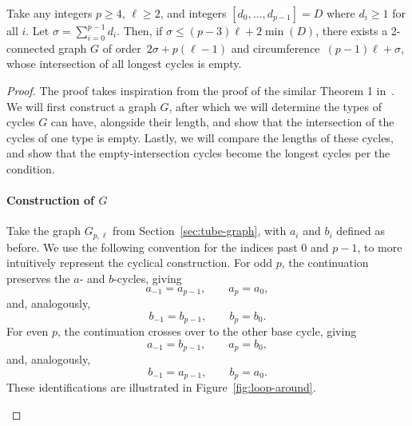 \begin{theorem}
  \label{theorem:d-extension}
Take any integers $p \ge 4$, $\ell \ge 2$, and integers $[d_0,\ldots,d_{p-1}] = D$ where $d_i \ge 1$ for all $i$. Let $\sigma = \sum_{i=0}^{p-1}d_i$. Then, if $\sigma \le (p-3)\ell + 2\min(D)$, there exists a 2-connected graph $G$ of order~$2\sigma + p(\ell-1)$ and circumference~$(p-1)\ell+\sigma$, whose intersection of all longest cycles is empty.
\end{theorem}
\begin{proof}
The proof takes inspiration from the proof of the similar Theorem 1 in~\cite{article:zamfirescu}. We will first construct a graph $G$, after which we will determine the types of cycles $G$ can have, alongside their length, and show that the intersection of the cycles of one type is empty. Lastly, we will compare the lengths of these cycles, and show that the empty-intersection cycles become the longest cycles per the condition.

\paragraph{Construction of $G$}
Take the graph $G_{p,\ell}$ from Section~\ref{sec:tube-graph}, with $a_i$ and $b_i$ defined as before. We use the following convention for the indices past 0 and $p-1$, to more intuitively represent the cyclical construction. For odd $p$, the continuation preserves the $a$- and $b$-cycles, giving
\[
a_{-1}=a_{p-1}, \qquad a_p=a_0,
\]
and, analogously,
\[
b_{-1}=b_{p-1}, \qquad b_p=b_0.
\]
For even $p$, the continuation crosses over to the other base cycle, giving
\[
a_{-1}=b_{p-1}, \qquad a_p=b_0,
\]
and, analogously,
\[
b_{-1}=a_{p-1}, \qquad b_p=a_0.
\]
These identifications are illustrated in Figure~\ref{fig:loop-around}.

\begin{figure}[ht]
    \centering

    \begin{subfigure}{0.45\textwidth}
        \centering
\end{subfigure}
\end{figure}
\end{proof}
